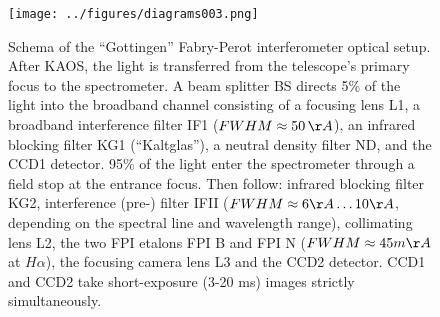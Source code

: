 \begin{figure}[t]
\begin{center}
\texttt{[image: ../figures/diagrams003.png]}
\caption{Schema of the ``Gottingen'' Fabry-Perot interferometer optical setup. After KAOS, the light is transferred from the telescope's primary focus to the spectrometer. A beam splitter BS directs 5\% of the light into the broadband channel consisting of a focusing lens L1, a broadband interference filter IF1 ($FWHM \approx 50\,\AA$), an infrared blocking filter KG1 (``Kaltglas''), a neutral density filter ND, and the CCD1 detector. 95\% of the light enter the spectrometer through a field stop at the entrance focus. Then follow: infrared blocking filter KG2, interference (pre-) filter IFII ($FWHM \approx 6 \AA\dots10\AA$, depending on the spectral line and wavelength range), collimating lens L2, the two FPI etalons FPI B and FPI N ($FWHM \approx 45 m\AA$ at $H\alpha$), the focusing camera lens L3 and the CCD2 detector. CCD1 and CCD2 take short-exposure (3-20 ms) images strictly simultaneously.}
\label{fig:gfpi:optical}
\end{center}
\end{figure}

